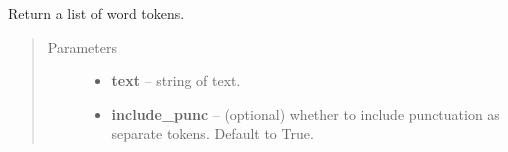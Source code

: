 \documentclass[letterpaper,10pt,english]{sphinxmanual}
\begin{document}
\begin{fulllineitems}

\begin{fulllineitems}
\label{api_reference:textblob_de.tokenizers.SentenceTokenizer.tokenize}
Return a list of word tokens.
\begin{quote}\begin{description}
\item[{Parameters}] \leavevmode\begin{itemize}
\item {} 
\textbf{text} -- string of text.

\item {} 
\textbf{include\_punc} -- (optional) whether to include punctuation as separate
tokens. Default to True.

\end{itemize}

\end{description}\end{quote}

\end{fulllineitems}


\end{fulllineitems}

\end{document}
